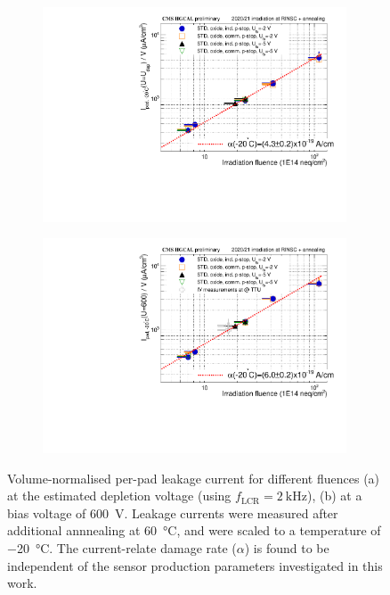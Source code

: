 \begin{figure}
	\captionsetup[subfigure]{aboveskip=-1pt,belowskip=-1pt}
	\begin{subfigure}[b]{0.49\textwidth}
		\centering
		\includegraphics[width=0.99\textwidth]{plots/alpha/alpha_Udep.pdf}
		\subcaption{
			}
			\label{plot:alpha_Udep}
	\end{subfigure}		
	\hfill
	\centering
	\begin{subfigure}[b]{0.49\textwidth}
		\centering
		\includegraphics[width=0.99\textwidth]{plots/alpha/alpha_600V.pdf}
		\subcaption{
			}
			\label{plot:alpha_600}
	\end{subfigure}
	\caption{
	    Volume-normalised per-pad leakage current for different fluences (a) at the estimated depletion voltage (using $f_\text{LCR}=\SI{2}{\kilo\hertz}$), (b) at a bias voltage of \SI{600}{\volt}.
		Leakage currents were measured after additional annnealing at \SI{60}{\celsius}, and were scaled to a temperature of \SI{-20}{\celsius}.
        The current-relate damage rate ($\alpha$) is found to be independent of the sensor production parameters investigated in this work.
	}
\end{figure}

